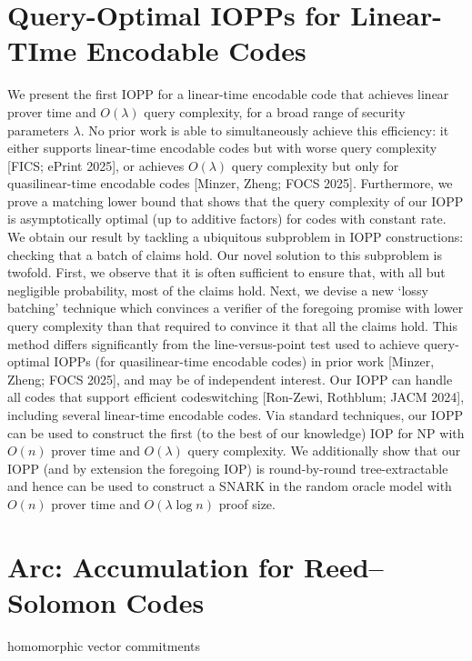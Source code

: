 \documentclass[11pt]{article}
\theoremstyle{definition}
\theoremstyle{remark}
\theoremstyle{plain}
\begin{document}
\section{\cite{cryptoeprint:2025/1588} Query-Optimal IOPPs for Linear-TIme Encodable Codes}
We present the first IOPP for a linear-time encodable code that achieves linear prover time and $O(\lambda)$ query complexity, for a broad range of security parameters $\lambda$. No prior work is able to simultaneously achieve this efficiency: it either supports linear-time encodable codes but with worse query complexity [FICS; ePrint 2025], or achieves $O(\lambda)$ query complexity but only for quasilinear-time encodable codes [Minzer, Zheng; FOCS 2025]. Furthermore, we prove a matching lower bound that shows that the query complexity of our IOPP is asymptotically optimal (up to additive factors) for codes with constant rate. We obtain our result by tackling a ubiquitous subproblem in IOPP constructions: checking that a batch of claims hold. Our novel solution to this subproblem is twofold. First, we observe that it is often sufficient to ensure that, with all but negligible probability, most of the claims hold. Next, we devise a new `lossy batching' technique which convinces a verifier of the foregoing promise with lower query complexity than that required to convince it that all the claims hold. This method differs significantly from the line-versus-point test used to achieve query-optimal IOPPs (for quasilinear-time encodable codes) in prior work [Minzer, Zheng; FOCS 2025], and may be of independent interest. Our IOPP can handle all codes that support efficient codeswitching [Ron-Zewi, Rothblum; JACM 2024], including several linear-time encodable codes. Via standard techniques, our IOPP can be used to construct the first (to the best of our knowledge) IOP for NP with $O(n)$ prover time and $O(\lambda)$ query complexity. We additionally show that our IOPP (and by extension the foregoing IOP) is round-by-round tree-extractable and hence can be used to construct a SNARK in the random oracle model with $O(n)$ prover time and $O(\lambda \log n)$ proof size.

\section{\cite{cryptoeprint:2024/1731} Arc: Accumulation for Reed--Solomon Codes}

homomorphic vector commitments

\cite{cryptoeprint:2024/474} 
\end{document}
